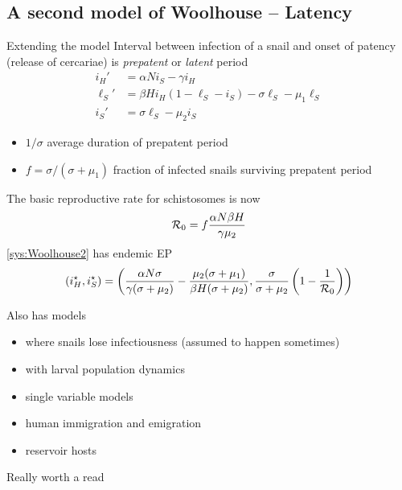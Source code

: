 \documentclass[aspectratio=169]{beamer}
\begin{document}
\subsection{A second model of Woolhouse -- Latency}
\begin{frame}{Extending the model}
  Interval between infection of a snail and onset of patency (release of cercariae) is \emph{prepatent} or \emph{latent} period
  \begin{subequations}
    \label{sys:Woolhouse2}
    \begin{align}
      i_H' &= \alpha Ni_S-\gamma i_H \\
      \ell_S' &= \beta Hi_H(1-\ell_S-i_S)-\sigma\ell_S-\mu_1\ell_S \\
      i_S' &= \sigma\ell_S-\mu_2 i_S
    \end{align}
  \end{subequations}
  \begin{itemize}
    \item $1/\sigma$ average duration of prepatent period
    \item $f=\sigma/(\sigma+\mu_1)$ fraction of infected snails surviving prepatent period
  \end{itemize}
\end{frame}

\begin{frame}
  The basic reproductive rate for schistosomes is now
  \begin{equation}
    \label{eq:R0_Woolhouse2}
    \mathcal{R}_0 = f\frac{\alpha N\beta H}{\gamma\mu_2}
  \end{equation}
  \vfill
  \eqref{sys:Woolhouse2} has endemic EP
  \[
    (i_H^\star,i_S^\star)=\left(\dfrac{\alpha N\sigma}{\gamma(\sigma+\mu_2)}-\dfrac{\mu_2(\sigma+\mu_1)}{\beta H(\sigma+\mu_2)},\frac{\sigma}{\sigma+\mu_2}\left(1-\dfrac{1}{\mathcal{R}_0}\right)\right)
  \]
\end{frame}

\begin{frame}
  Also has models
  \begin{itemize}
    \item where snails lose infectiousness (assumed to happen sometimes)
    \item with larval population dynamics
    \item single variable models
    \item human immigration and emigration
    \item reservoir hosts
  \end{itemize}
  \vfill
  Really worth a read
\end{frame}
\end{document}
